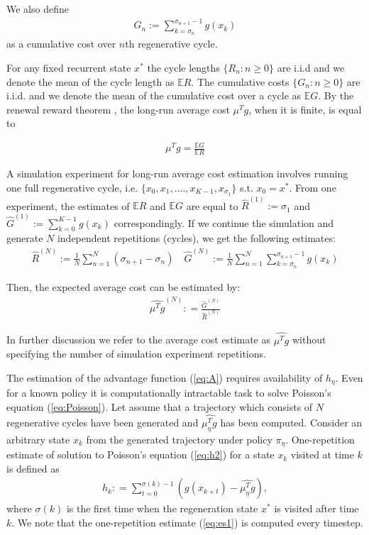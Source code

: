 \documentclass[11pt]{article}
\newcommand{\E}{\mathbb{E}}
\theoremstyle{definition}
\numberwithin{equation}{section}
\begin{document}
We also define 
\begin{align*}
G_n :=\sum\limits_{k=\sigma_n}^{\sigma_{n+1}-1} g(x_{k})
\end{align*}     
as a cumulative cost over $n$th regenerative cycle.

For any fixed recurrent state $x^*$ the cycle lengths $\{R_n: n\geq 0\}$ are i.i.d and we denote the mean of the cycle length as $\E R $. The cumulative costs $\{G_n: n\geq 0\}$ are  i.i.d. and  we denote the mean of the cumulative cost over a cycle as $\E G $.  By the renewal reward theorem \cite[Section VI]{Asmussen2003}, the long-run average cost $\mu^T g$, when it is finite, is equal to

\begin{align*}
\mu^T g = \frac{\E G}{\E R } 
\end{align*} 


A simulation experiment for long-run average cost estimation involves  running one full regenerative cycle, i.e. $\{x_0,  x_1, ...., x_{K-1}, x_{\sigma_1}\}$ s.t. $x_0= x^*$. From one experiment, the estimates of $\E R$ and $\E G$  are equal to $\widehat{R}^{(1)} := \sigma_1$ and  $\widehat{G}^{(1)} :=   \sum\limits_{k=0}^{K-1} g(x_{k}) $ correspondingly. If we continue the simulation and generate $N$ independent repetitions (cycles), we get the following estimates:
\begin{align*}
 \widehat{R}^{(N)}:= \frac{1}{N}\sum\limits_{n=1}^N (\sigma_{n+1} - \sigma_{n}) \quad \widehat{G}^{(N)}:= \frac{1}{N}\sum\limits_{n=1}^N \sum\limits_{k=\sigma_{n}}^{\sigma_{n+1}-1} g(x_k)
\end{align*} 

 
Then, the expected average cost can be estimated by:
\begin{align}\label{es_av}
\widehat{\mu^T  g} ^{(N)} : =\frac{\widehat{G}^{(N)}   }{ \widehat{R }^{(N)}} 
\end{align}


In further discussion we refer to the average cost estimate as $\widehat{\mu^T  g}$ without specifying the number of simulation experiment repetitions.  

 The  estimation of the advantage function (\ref{eq:A}) requires availability of $h_\eta$. Even for a known policy it is computationally intractable task to solve Poisson's equation (\ref{eq:Poisson}).  
  Let assume that a trajectory which consists of $N$ regenerative cycles have been generated and $\widehat {\mu_\eta^Tg}$ has been computed. Consider an arbitrary state $x_k$ from the generated trajectory under policy $\pi_\eta$. One-repetition estimate of  solution to Poisson's equation (\ref{eq:h2}) for a state $x_k$ visited at time $k$ is defined as
\begin{align}\label{eq:es1}
\hat h_k: =  \sum\limits_{t=0}^{\sigma(k)-1} \left(g(x_{k+t }) - \widehat {\mu_\eta^Tg}  \right) ,
\end{align}
where $\sigma(k)$  is the first time when the regeneration state $x^*$ is visited after time $k$. 
We note that the one-repetition estimate (\ref{eq:es1}) is computed every timestep.
\end{document}
